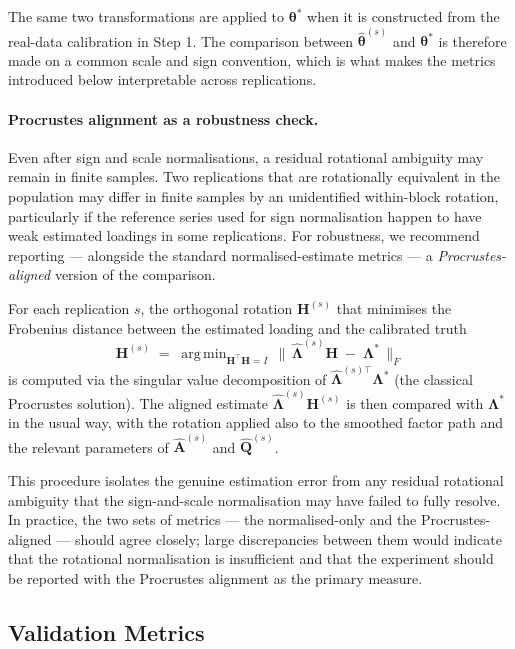 \documentclass[11pt, a4paper, oneside]{article}
\DeclareMathOperator*{\argmin}{arg\,min}
\newcommand{\mA}{\mathbf{A}}
\begin{document}
The same two transformations are applied to $\boldsymbol{\theta}^*$
when it is constructed from the real-data calibration in Step 1.
The comparison between $\hat{\boldsymbol{\theta}}^{(s)}$ and
$\boldsymbol{\theta}^*$ is therefore made on a common scale and
sign convention, which is what makes the metrics introduced below
interpretable across replications.

\paragraph{Procrustes alignment as a robustness check.}
Even after sign and scale normalisations, a residual rotational
ambiguity may remain in finite samples. Two replications that are
rotationally equivalent in the population may differ in finite
samples by an unidentified within-block rotation, particularly if
the reference series used for sign normalisation happen to have
weak estimated loadings in some replications. For robustness, we
recommend reporting — alongside the standard normalised-estimate
metrics — a \emph{Procrustes-aligned} version of the comparison.

For each replication $s$, the orthogonal rotation
$\mathbf{H}^{(s)}$ that minimises the Frobenius distance between
the estimated loading and the calibrated truth
\[
\mathbf{H}^{(s)} \;=\; \argmin_{\mathbf{H}^{\top}\mathbf{H} = I}\,
\big\|\, \hat{\boldsymbol{\Lambda}}^{(s)} \mathbf{H} \;-\; \boldsymbol{\Lambda}^* \,\big\|_F
\]
is computed via the singular value decomposition of
$\hat{\boldsymbol{\Lambda}}^{(s)\top} \boldsymbol{\Lambda}^*$ (the
classical Procrustes solution). The aligned estimate
$\hat{\boldsymbol{\Lambda}}^{(s)} \mathbf{H}^{(s)}$ is then
compared with $\boldsymbol{\Lambda}^*$ in the usual way, with the
rotation applied also to the smoothed factor path and the relevant
parameters of $\hat{\mA}^{(s)}$ and $\hat{\mathbf{Q}}^{(s)}$.

This procedure isolates the genuine estimation error from any
residual rotational ambiguity that the sign-and-scale normalisation
may have failed to fully resolve. In practice, the two sets of
metrics — the normalised-only and the Procrustes-aligned — should
agree closely; large discrepancies between them would indicate
that the rotational normalisation is insufficient and that the
experiment should be reported with the Procrustes alignment as the
primary measure.

\subsection{Validation Metrics}
\label{subsec:mc-metrics}
\end{document}
